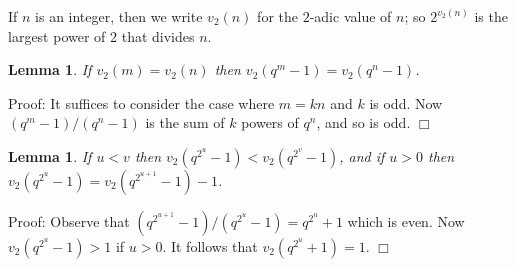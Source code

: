 \documentclass[12pt]{article}
\newtheorem{lemma}[definition]{Lemma}
\newenvironment{proof}{\normalsize {\sc Proof}:}{{\hfill $\Box$ \\}}
\begin{document}
If $n$ is an integer, then we write $v_2(n)$ for the $2$-adic value of 
$n$; so $2^{v_2(n)}$ is the
largest power of $2$ that divides $n$.
\begin{lemma}\label{Lemma5.6} 
If $v_2(m)=v_2(n)$ then $v_2(q^m-1) = v_2(q^n-1)$.
\end{lemma}
\begin{proof} 
 It suffices to consider the case where $m=kn$ and $k$ is odd.
Now $(q^m-1)/(q^n-1)$ is the sum of $k$ powers of $q^n$, and so is odd.
\end{proof}
\begin{lemma}\label{Lemma5.7} If $u<v$ then $v_2(q^{2^u}-1)<v_2(q^{2^v}-1)$, 
and if $u>0$ then $v_2(q^{2^u}-1) =v_2(q^{2^{u+1}}-1)-1$.
\end{lemma}
\begin{proof} 
Observe that $(q^{2^{u+1}}-1)/(q^{2^u}-1)=q^{2^u}+1$ which is even. Now
$v_2(q^{2^u}-1)>1$ if $u>0$. It follows that $v_2(q^{2^u}+1)=1$.
\end{proof}
\end{document}
